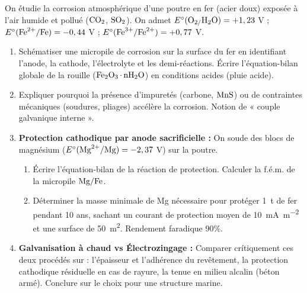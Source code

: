 \documentclass[11pt]{article}
\begin{document}
\begin{exercice}
On étudie la corrosion atmosphérique d'une poutre en fer (acier doux) exposée à l'air humide et pollué ($\ce{CO2}$, $\ce{SO2}$). On admet $E^\circ(\ce{O2/H2O}) = +1,23$ V ; $E^\circ(\ce{Fe^{2+}/Fe}) = -0,44$ V ; $E^\circ(\ce{Fe^{3+}/Fe^{2+}}) = +0,77$ V.
\begin{enumerate}
    \item Schématiser une micropile de corrosion sur la surface du fer en identifiant l'anode, la cathode, l'électrolyte et les demi-réactions. Écrire l'équation-bilan globale de la rouille ($\ce{Fe2O3.nH2O}$) en conditions acides (pluie acide).
    \item Expliquer pourquoi la présence d'impuretés (carbone, $\ce{MnS}$) ou de contraintes mécaniques (soudures, pliages) accélère la corrosion. Notion de « couple galvanique interne ».
    \item \textbf{Protection cathodique par anode sacrificielle :} On soude des blocs de magnésium ($E^\circ(\ce{Mg^{2+}/Mg}) = -2,37$ V) sur la poutre.
    \begin{enumerate}[label=\alph*)]
        \item Écrire l'équation-bilan de la réaction de protection. Calculer la f.é.m. de la micropile $\ce{Mg/Fe}$.
        \item Déterminer la masse minimale de Mg nécessaire pour protéger \SI{1}{t} de fer pendant 10 ans, sachant un courant de protection moyen de \SI{10}{mA.m^{-2}} et une surface de \SI{50}{m^2}. Rendement faradique 90\%.
    \end{enumerate}
    \item \textbf{Galvanisation à chaud vs Électrozingage :} Comparer crítiquement ces deux procédés sur : l'épaisseur et l'adhérence du revêtement, la protection cathodique résiduelle en cas de rayure, la tenue en milieu alcalin (béton armé). Conclure sur le choix pour une structure marine.
\end{enumerate}
\end{exercice}
\end{document}
